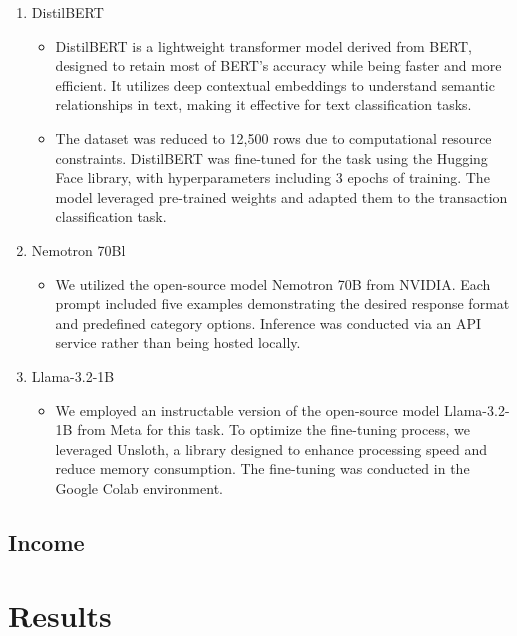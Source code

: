 \documentclass[12pt,letterpaper]{article}
\begin{document}
\begin{enumerate}
        \item {DistilBERT}
            \begin{itemize}
                \item {DistilBERT is a lightweight transformer model derived from BERT, designed to retain most of BERT’s accuracy while being faster and more efficient. It utilizes deep contextual embeddings to understand semantic relationships in text, making it effective for text classification tasks.}
                \item {The dataset was reduced to 12,500 rows due to computational resource constraints. DistilBERT was fine-tuned for the task using the Hugging Face library, with hyperparameters including 3 epochs of training. The model leveraged pre-trained weights and adapted them to the transaction classification task.}
            \end{itemize}
        \item {Nemotron 70Bl}
            \begin{itemize}
                \item {We utilized the open-source model Nemotron 70B from NVIDIA. Each prompt included five examples demonstrating the desired response format and predefined category options. Inference was conducted via an API service rather than being hosted locally.}
            \end{itemize}
        \item {Llama-3.2-1B}
            \begin{itemize}
                \item{We employed an instructable version of the open-source model Llama-3.2-1B from Meta for this task. To optimize the fine-tuning process, we leveraged Unsloth, a library designed to enhance processing speed and reduce memory consumption. The fine-tuning was conducted in the Google Colab environment.}
            \end{itemize}
    \end{enumerate}



\subsection{Income}


\section{Results}
\end{document}
